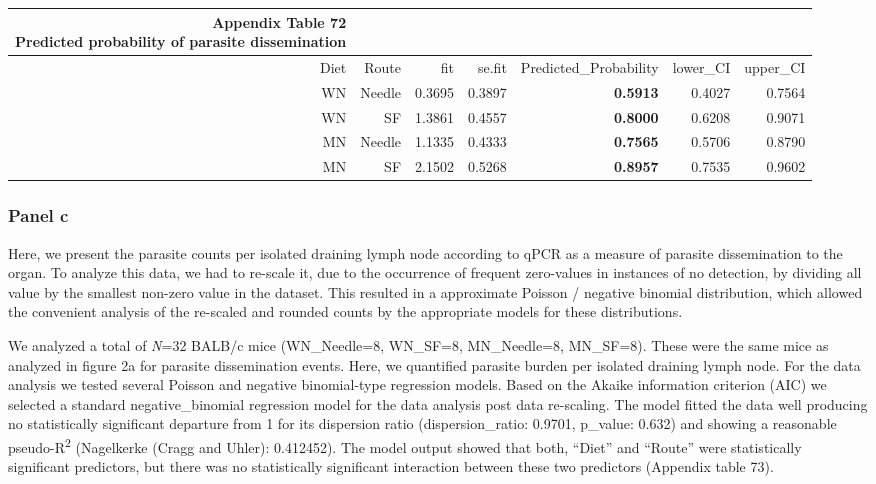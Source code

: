 \documentclass[
  12pt,
  letterpaper,
]{article}
\begin{document}
\begingroup
\fontsize{12.0pt}{14.4pt}\selectfont
\begin{longtable}{rrrrrrr}
\caption*{
{\large \textbf{Appendix Table 72}} \\ 
{\small \textbf{Predicted probability of parasite dissemination}}
} \\ 
\toprule
{Diet} & {Route} & {fit} & {se.fit} & Predicted\_Probability & lower\_CI & upper\_CI \\ 
\midrule\addlinespace[2.5pt]
WN & Needle & 0.3695 & 0.3897 & {\bfseries 0.5913} & 0.4027 & 0.7564 \\ 
WN & SF & 1.3861 & 0.4557 & {\bfseries 0.8000} & 0.6208 & 0.9071 \\ 
MN & Needle & 1.1335 & 0.4333 & {\bfseries 0.7565} & 0.5706 & 0.8790 \\ 
MN & SF & 2.1502 & 0.5268 & {\bfseries 0.8957} & 0.7535 & 0.9602 \\ 
\bottomrule
\end{longtable}
\endgroup

\subsubsection{Panel c}\label{panel-c}

Here, we present the parasite counts per isolated draining lymph node according to qPCR as a measure of parasite dissemination to the organ. To analyze this data, we had to re-scale it, due to the occurrence of frequent zero-values in instances of no detection, by dividing all value by the smallest non-zero value in the dataset. This resulted in a approximate Poisson / negative binomial distribution, which allowed the convenient analysis of the re-scaled and rounded counts by the appropriate models for these distributions.

We analyzed a total of \emph{N}=32 BALB/c mice (WN\_Needle=8, WN\_SF=8, MN\_Needle=8, MN\_SF=8). These were the same mice as analyzed in figure 2a for parasite dissemination events. Here, we quantified parasite burden per isolated draining lymph node. For the data analysis we tested several Poisson and negative binomial-type regression models. Based on the Akaike information criterion (AIC) we selected a standard negative\_binomial regression model for the data analysis post data re-scaling. The model fitted the data well producing no statistically significant departure from 1 for its dispersion ratio (dispersion\_ratio: 0.9701, p\_value: 0.632) and showing a reasonable pseudo-R\textsuperscript{2} (Nagelkerke (Cragg and Uhler): 0.412452). The model output showed that both, ``Diet'' and ``Route'' were statistically significant predictors, but there was no statistically significant interaction between these two predictors (Appendix table 73).
\end{document}
